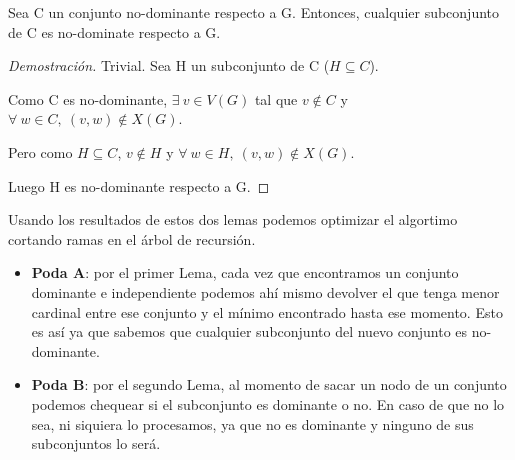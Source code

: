     \begin{lemma}
        Sea C un conjunto no-dominante respecto a G. Entonces, cualquier subconjunto de C es no-dominate respecto a G.
    \end{lemma}
    \begin{proof}[Demostración]
        Trivial. Sea H un subconjunto de C ($H \subseteq C$).

        Como C es no-dominante, $\exists\ v \in V(G)$ tal que $v \notin C$ y $\forall\ w \in C,\ (v,w) \notin X(G)$.

        Pero como $H \subseteq C$, $v \notin H$ y $\forall\ w \in H,\ (v,w) \notin X(G)$.

        Luego H es no-dominante respecto a G.
    \end{proof}

    Usando los resultados de estos dos lemas podemos optimizar el algortimo cortando ramas en el árbol de recursión.
    \begin{itemize}
        \item \textbf{Poda A}: por el primer Lema, cada vez que encontramos un conjunto dominante e independiente podemos ahí mismo devolver el que tenga menor cardinal entre ese conjunto y el mínimo encontrado hasta ese momento. Esto es así ya que sabemos que cualquier subconjunto del nuevo conjunto es no-dominante.
        \item \textbf{Poda B}: por el segundo Lema, al momento de sacar un nodo de un conjunto podemos chequear si el subconjunto es dominante o no. En caso de que no lo sea, ni siquiera lo procesamos, ya que no es dominante y ninguno de sus subconjuntos lo será.
    \end{itemize}
